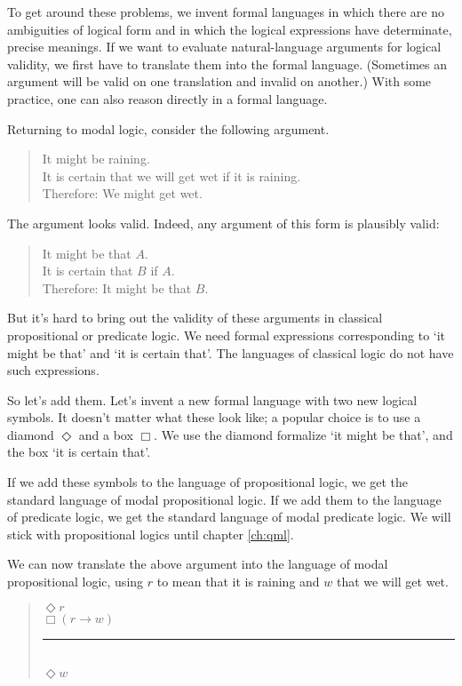 To get around these problems, we invent formal languages in which there are no
ambiguities of logical form and in which the logical expressions have
determinate, precise meanings. If we want to evaluate natural-language arguments
for logical validity, we first have to translate them into the formal language.
(Sometimes an argument will be valid on one translation and invalid on another.)
With some practice, one can also reason directly in a formal language.

Returning to modal logic, consider the following argument.
%
\begin{quote}
  It might be raining.\\
  It is certain that we will  get wet if it is raining.\\
  Therefore: We might get wet.
\end{quote}
%
The argument looks valid. Indeed, any argument of this form is plausibly valid:
\begin{quote}
  It might be that $A$.\\
  It is certain that $B$ if $A$.\\
  Therefore: It might be that $B$.
\end{quote}
But it's hard to bring out the validity of these arguments in classical
propositional or predicate logic. We need formal expressions corresponding to
`it might be that' and `it is certain that'. The languages of classical
logic do not have such expressions.

So let's add them. Let's invent a new formal language with two new logical
symbols. It doesn't matter what these look like; a popular choice is to use a
diamond $\Diamond$ and a box $\Box$. We use the diamond formalize `it might be
that', and the box `it is certain that'.

If we add these symbols to the language of propositional logic, we get the
standard language of modal propositional logic. If we add them to the language
of predicate logic, we get the standard language of modal predicate logic. We
will stick with propositional logics until chapter \ref{ch:qml}.

We can now translate the above argument into the language of modal propositional
logic, using $r$ to mean that it is raining and $w$ that we will get wet.
\begin{quote}
  $\Diamond r$\\
  $\Box(r \to w)$\\[-3mm]
  \rule{2cm}{0.2mm}\\
  $\Diamond w$
\end{quote}

